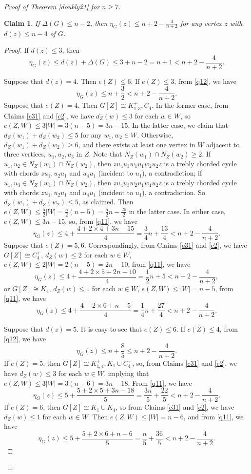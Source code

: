 \documentclass[12pt]{article}
\newtheorem {claim}{Claim}[section]
\begin{document}
\begin{proof}[Proof of Theorem \ref{doubly21} for $n\ge 7$]
\begin{claim}\label{new}
If $\Delta(G)\le n-2$, then $\eta_G(z)\le n+2-\frac{4}{n+2}$ for any vertex $z$ with $d(z)\le n-4$ of $G$.
\end{claim}
\begin{proof}
If $d(z)\le 3$, then
\[
\eta_{G}(z)\le d(z)+\Delta(G)\le 3+n-2=n+1<n+2-\frac{4}{n+2}.
\]

Suppose that $d(z)=4$. Then  $e(Z)\le 6$.
If $e(Z)\le 3$, from \eqref{q12}, we have
\[
\eta_{G}(z)\le n+\frac{3}{2}< n+2-\frac{4}{n+2}.
\]
Suppose that $e(Z)=4$. Then $G[Z]\cong K_{1,3}^+, C_4$.
In the former case,  from Claims \ref{c31} and \ref{c2}, we have $d_Z(w)\le 3$ for each $w\in W$,
so  $e(Z,W)\le 3|W|=3(n-5)=3n-15$. In the latter case,
we claim that $d_Z(w_1)+d_Z(w_2)\le 5$ for any $w_1,w_2\in W$.
Otherwise, $d_Z(w_1)+d_{Z}(w_2)\ge 6$, and there exists at least one vertex in $W$ adjacent to three vertices, $u_1,u_2,u_3$ in $Z$.
Note that $N_{Z}(w_1)\cap N_{Z}(w_2)\ge 2$.
If $u_1,u_2\in N_{Z}(w_1)\cap N_{Z}(w_2)$, then $zu_4u_3w_1u_1w_2u_2z$ is a trebly chorded cycle with  chords $zu_1, u_2u_1$ and $u_4u_1$ (incident to $u_1$), a contradiction;
if $u_1,u_3\in N_{Z}(w_1)\cap N_{Z}(w_2)$, then $zu_4u_3w_2u_1w_1u_2z$ is a trebly chorded cycle with  chords $zu_1, u_2u_1$ and $u_4u_1$ (incident to $u_1$), a contradiction. So  $d_Z(w_1)+d_{Z}(w_2)\le 5$, as claimed.  Then $e(Z,W)\le \frac{5}{2}|W|=\frac{5}{2}(n-5)=\frac{5}{2}n-\frac{25}{2}$ in the latter case.
In either case, $e(Z,W)\le 3n-15$, so,
from \eqref{q11}, we have
\[
\eta_{G}(z)\le 4+\frac{4+2\times 4+3n-15}{4}=\frac{3}{4}n+\frac{13}{4}<n+2-\frac{4}{n+2}.
\]
Suppose that $e(Z)=5,6$. Correspondingly, from Claims \ref{c31} and \ref{c2}, we have $G[Z]\cong C_4^+$, $d_Z(w)\le 2$ for each $w\in W$, $e(Z,W)\le 2|W|=2(n-5)=2n-10$, from \eqref{q11}, we have
\[
\eta_{G}(z)\le 4+\frac{4+2\times 5+2n-10}{4}=\frac{1}{2}n+5<n+2-\frac{4}{n+2},
\]
or $G[Z]\cong K_4$, $d_Z(w)\le 1$ for each $w\in W$, $e(Z,W)\le  |W|=n-5$,
from \eqref{q11}, we have
\[
\eta_{G}(z)\le 4+\frac{4+2\times 6+n-5}{4}=\frac{1}{4}n+\frac{27}{4}<n+2-\frac{4}{n+2}.
\]


Suppose that $d(z)=5$.  It is easy to see that $e(Z)\le 6$.
If $e(Z)\le 4$, from \eqref{q12}, we have
\[
\eta_{G}(z)\le n+\frac{8}{5}\le n+2-\frac{4}{n+2}.
\]
If $e(Z)=5$, then $G[Z]\cong K_{1,4}^+, K_1\cup C_4^+$, so,
from Claims \ref{c31} and \ref{c2}, we have $d_Z(w)\le 3$ for each $w\in W$, implying that
 $e(Z,W)\le 3|W|=3(n-6)=3n-18$. From \eqref{q11}, we have
\[
\eta_{G}(z)\le 5+\frac{5+2\times 5+3n-18}{5}=\frac{3n}{5}+\frac{22}{5}< n+2-\frac{4}{n+2}.
\]
If $e(Z)=6$, then $G[Z]\cong K_1\cup K_4$, so from Claims \ref{c31} and \ref{c2}, we have $d_Z(w)\le 1$ for each $w\in W$. Then $e(Z,W)\le  |W|=n-6$, and from \eqref{q11}, we have
\[
\eta_{G}(z)\le 5+\frac{5+2\times 6+n-6}{5}=\frac{n}{5}+\frac{36}{5}<n+2-\frac{4}{n+2}.
\]



\end{proof}
\end{proof}
\end{document}
